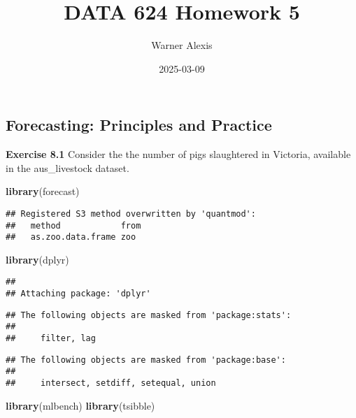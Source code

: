 \documentclass[
]{article}
\title{DATA 624 Homework 5}
\author{Warner Alexis}
\date{2025-03-09}
\newenvironment{Shaded}{\begin{snugshade}}{\end{snugshade}}
\newcommand{\FunctionTok}[1]{\textcolor[rgb]{0.13,0.29,0.53}{\textbf{#1}}}
\newcommand{\NormalTok}[1]{#1}
\begin{document}
\maketitle

\hypertarget{forecasting-principles-and-practice}{%
\subsection{\texorpdfstring{\textbf{Forecasting: Principles and
Practice}}{Forecasting: Principles and Practice}}\label{forecasting-principles-and-practice}}

\textbf{Exercise 8.1} Consider the the number of pigs slaughtered in
Victoria, available in the aus\_livestock dataset.

\begin{Shaded}
\begin{Highlighting}[]
\FunctionTok{library}\NormalTok{(forecast)}
\end{Highlighting}
\end{Shaded}

\begin{verbatim}
## Registered S3 method overwritten by 'quantmod':
##   method            from
##   as.zoo.data.frame zoo
\end{verbatim}

\begin{Shaded}
\begin{Highlighting}[]
\FunctionTok{library}\NormalTok{(dplyr)}
\end{Highlighting}
\end{Shaded}

\begin{verbatim}
## 
## Attaching package: 'dplyr'
\end{verbatim}

\begin{verbatim}
## The following objects are masked from 'package:stats':
## 
##     filter, lag
\end{verbatim}

\begin{verbatim}
## The following objects are masked from 'package:base':
## 
##     intersect, setdiff, setequal, union
\end{verbatim}

\begin{Shaded}
\begin{Highlighting}[]
\FunctionTok{library}\NormalTok{(mlbench)}
\FunctionTok{library}\NormalTok{(tsibble)}
\end{Highlighting}
\end{Shaded}
\end{document}
